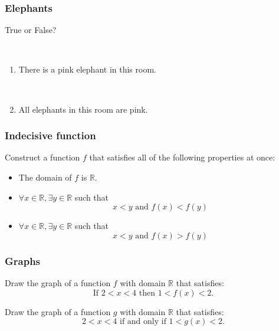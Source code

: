 \documentclass[14pt]{beamer}
\newcommand {\DS} [1] {${\displaystyle #1}$}
\newcommand {\R}{\mathbb{R}}
\begin{document}
\begin{frame}
\frametitle{Elephants}

True or False?

\

\begin{enumerate}
	\item  There is a pink elephant in this room.

\

	\item  All elephants in this room are pink.
\end{enumerate}

\end{frame}
\begin{frame}
\frametitle{Indecisive function}

Construct a function $f$ that satisfies all of the following properties at once:
	\begin{itemize}
		\item  The domain of $f$ is $\R$.
		\item  \DS{\forall x \in \R, \exists y \in \R} such that
			$$  x<y \mbox{ and } f(x) < f(y) $$
		\item  \DS{\forall x \in \R, \exists y \in \R} such that
			$$  x<y \mbox{ and } f(x) > f(y) $$
	\end{itemize}

\end{frame}

\begin{frame}
\frametitle{Graphs}

Draw the graph of a function $f$ with domain $\mathbb{R}$ that satisfies:
	\begin{equation*}
		\mbox{If } 2<x<4 \mbox{ then } 1<f(x)<2.  	
	\end{equation*}
\vfill

Draw the graph of a function $g$ with domain $\mathbb{R}$ that satisfies:
	\begin{equation*}
		2<x<4 \mbox{ if and only if } 1 < g(x) < 2.
	\end{equation*}
\vfill

\end{frame}

\end{document}
